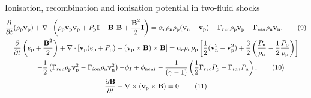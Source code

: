 \documentclass[10pt,aspectratio=169,usenames,dvipsnames]{beamer}
\begin{document}
\begin{frame}{Ionisation, recombination and ionisation potential in two-fluid shocks}
\begin{gather}
\frac{\partial}{\partial t} (\rho_{\text{p}} \textbf{v}_{\text{p}})+ \nabla \cdot \left( \rho_{\text{p}} \textbf{v}_{\text{p}} \textbf{v}_{\text{p}} + P_{\text{p}} \textbf{I} - \textbf{B B} + \frac{\textbf{B}^2}{2} \textbf{I} \right) = \alpha _c \rho_{\text{n}} \rho_{\text{p}}(\textbf{v}_{\text{n}} - \textbf{v}_{\text{p}}) - \Gamma _{rec} \rho _{\rm p} \textbf{v}_{\rm p} + \Gamma _{ion} \rho_{\rm n} \textbf{v}_{\rm n},\tag{9}\\
\frac{\partial}{\partial t} \left( e_{\text{p}} + \frac{\textbf{B}^2}{2} \right) + \nabla \cdot \left[ \textbf{v}_{\text{p}} ( e_{\text{p}} + P_{\text{p}}) -  (\textbf{v}_{\rm p} \times \textbf{B}) \times \textbf{B} \right]  =  \alpha _c \rho _{\text{n}} \rho _{\text{p}} \left[ \frac{1}{2} (\textbf{v}_{\text{n}} ^2 - \textbf{v}_{\text{p}} ^2)+ \frac{3}{2} \left(\frac{P_{\rm n}}{\rho_{\rm n}}-\frac{1}{2}\frac{P_{\rm p}}{\rho_{\rm p}}\right) \right] \nonumber \\ \hspace{0.5cm}- \frac{1}{2} \left( \Gamma _{rec} \rho _{\rm p} \textbf{v}_{\rm p} ^2 - \Gamma _{ion} \rho _{\rm n} \textbf{v}_{\rm n} ^2 \right) {- \phi_I + \phi_{heat}} -\frac{1}{ (\gamma-1)} \left( \frac{1}{2} \Gamma _{rec} P_{\rm p} -\Gamma _{ion} P_{\rm n} \right), \label{eqn:ep}\tag{10} \\
\frac{\partial \textbf{B}}{\partial t} - \nabla \times (\textbf{v}_{\text{p}} \times \textbf{B}) = 0.\tag{11}
\end{gather}
\end{frame}
\end{document}
